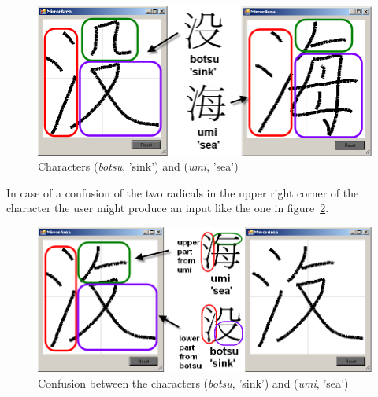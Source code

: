 \begin{figure}[htbp]
  \begin{center}
    \includegraphics[scale=0.75]{images/char935vsChar117HandwrittenMarked.png}
    \caption{Characters  (\emph{botsu}, 'sink') and  (\emph{umi}, 'sea')}
    \label{fig:eval:botsuumiprintvsdrawn}
  \end{center}
\end{figure}
In case of a confusion of the two radicals in the upper right corner of 
the character the user might produce an input like the one in 
figure~\ref{fig:eval:hybrid935and117}.
\begin{figure}[htbp]
  \begin{center}
    \includegraphics[scale=0.57]{images/char935and117HybridMarked.png}
    \caption{Confusion between the characters  (\emph{botsu}, 'sink') and  (\emph{umi}, 'sea')}
    \label{fig:eval:hybrid935and117}
  \end{center}
\end{figure}

